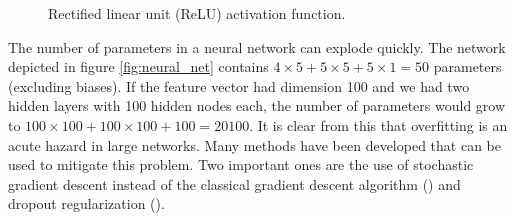 \begin{figure}[!ht]
\centering
{}
\caption{Rectified linear unit (ReLU) activation function.}\label{fig:relu_function}
\end{figure}

The number of parameters in a neural network can explode quickly. The network depicted
in figure \ref{fig:neural_net} contains $4 \times 5 + 5 \times 5 + 5 \times 1 = 50$
parameters (excluding biases). If the feature vector had dimension 100 and we had two
hidden layers with 100 hidden nodes each, the number of parameters would grow to $100
\times 100 + 100 \times 100 + 100 = 20100$. It is clear from this that overfitting is an
acute hazard in large networks. Many methods have been developed that can be used to
mitigate this problem. Two important ones are the use of stochastic gradient descent
instead of the classical gradient descent algorithm (\cite{Ruppert.1985}) and dropout
regularization (\cite{Srivastava.2014}).
